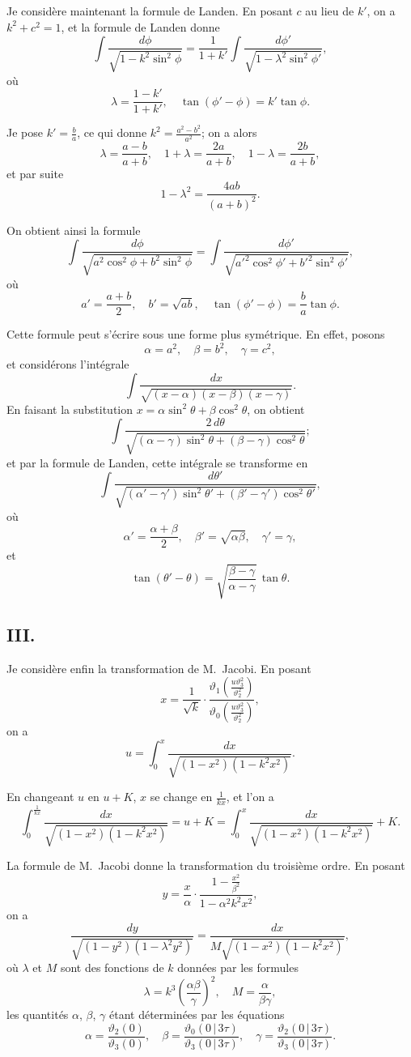 \documentclass[11pt,a4paper]{article}
\begin{document}
Je considère maintenant la formule de Landen. En posant $c$ au lieu de $k'$, on a $k^2+c^2=1$, et la formule de Landen donne
\[
\int \frac{d\phi}{\sqrt{1-k^2\sin^2\phi}}
= \frac{1}{1+k'} \int \frac{d\phi'}{\sqrt{1-\lambda^2\sin^2\phi'}},
\]
où
\[
\lambda = \frac{1-k'}{1+k'}, \quad \tan(\phi'-\phi) = k'\tan\phi.
\]

Je pose $k' = \frac{b}{a}$, ce qui donne $k^2 = \frac{a^2-b^2}{a^2}$; on a alors
\[
\lambda = \frac{a-b}{a+b}, \quad 1+\lambda = \frac{2a}{a+b}, \quad 1-\lambda = \frac{2b}{a+b},
\]
et par suite
\[
1-\lambda^2 = \frac{4ab}{(a+b)^2}.
\]

On obtient ainsi la formule
\[
\int \frac{d\phi}{\sqrt{a^2\cos^2\phi+b^2\sin^2\phi}}
= \int \frac{d\phi'}{\sqrt{a'^2\cos^2\phi'+b'^2\sin^2\phi'}},
\]
où
\[
a' = \frac{a+b}{2}, \quad b' = \sqrt{ab}, \quad \tan(\phi'-\phi) = \frac{b}{a}\tan\phi.
\]

\setcounter{page}{65}

Cette formule peut s'écrire sous une forme plus symétrique. En effet, posons
\[
\alpha = a^2, \quad \beta = b^2, \quad \gamma = c^2,
\]
et considérons l'intégrale
\[
\int \frac{dx}{\sqrt{(x-\alpha)(x-\beta)(x-\gamma)}}.
\]
En faisant la substitution $x = \alpha\sin^2\theta + \beta\cos^2\theta$, on obtient
\[
\int \frac{2\,d\theta}{\sqrt{(\alpha-\gamma)\sin^2\theta+(\beta-\gamma)\cos^2\theta}};
\]
et par la formule de Landen, cette intégrale se transforme en
\[
\int \frac{d\theta'}{\sqrt{(\alpha'-\gamma')\sin^2\theta'+(\beta'-\gamma')\cos^2\theta'}},
\]
où
\[
\alpha' = \frac{\alpha+\beta}{2}, \quad \beta' = \sqrt{\alpha\beta}, \quad \gamma' = \gamma,
\]
et
\[
\tan(\theta'-\theta) = \sqrt{\frac{\beta-\gamma}{\alpha-\gamma}}\,\tan\theta.
\]

\setcounter{page}{66}

\subsection*{III.}

Je considère enfin la transformation de M.~Jacobi. En posant
\[
x = \frac{1}{\sqrt{k}} \cdot \frac{\vartheta_1(\frac{u\vartheta_3^2}{\vartheta_2^2})}{\vartheta_0(\frac{u\vartheta_3^2}{\vartheta_2^2})},
\]
on a
\[
u = \int_0^x \frac{dx}{\sqrt{(1-x^2)(1-k^2x^2)}}.
\]

En changeant $u$ en $u+K$, $x$ se change en $\frac{1}{kx}$, et l'on a
\[
\int_0^{\frac{1}{kx}} \frac{dx}{\sqrt{(1-x^2)(1-k^2x^2)}}
= u + K = \int_0^x \frac{dx}{\sqrt{(1-x^2)(1-k^2x^2)}} + K.
\]

La formule de M.~Jacobi donne la transformation du troisième ordre. En posant
\[
y = \frac{x}{\alpha} \cdot \frac{1-\frac{x^2}{\beta^2}}{1-\alpha^2 k^2 x^2},
\]
on a
\[
\frac{dy}{\sqrt{(1-y^2)(1-\lambda^2y^2)}}
= \frac{dx}{M\sqrt{(1-x^2)(1-k^2x^2)}},
\]
où $\lambda$ et $M$ sont des fonctions de $k$ données par les formules
\[
\lambda = k^3 \left(\frac{\alpha\beta}{\gamma}\right)^2, \quad M = \frac{\alpha}{\beta\gamma},
\]
les quantités $\alpha$, $\beta$, $\gamma$ étant déterminées par les équations
\[
\alpha = \frac{\vartheta_2(0)}{\vartheta_3(0)}, \quad
\beta = \frac{\vartheta_0(0\,|\,3\tau)}{\vartheta_3(0\,|\,3\tau)}, \quad
\gamma = \frac{\vartheta_2(0\,|\,3\tau)}{\vartheta_3(0\,|\,3\tau)}.
\]
\end{document}
